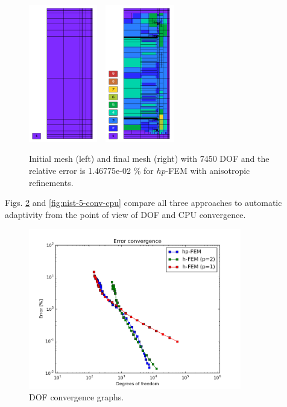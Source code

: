 \documentclass[12pt]{elsarticle}
\begin{document}
\begin{figure}[H]
\centering
\includegraphics[height=6cm]{nist/nist-5/mesh_hp_aniso_init.png}\ \
\includegraphics[height=6cm]{nist/nist-5/mesh_hp_aniso.png}
\caption{Initial mesh (left) and final mesh (right) with 7450 DOF and the relative error is 1.46775e-02 \% for $hp$-FEM with anisotropic refinements.}
\label{fig:nist-5-hp-aniso}
\end{figure}

Figs. \ref{fig:nist-5-conv-dof} and \ref{fig:nist-5-conv-cpu} compare all
three approaches to automatic adaptivity from the point
of view of DOF and CPU convergence.

\begin{figure}[H]
\centering
\includegraphics[height=7cm]{nist/nist-5/conv_dof_aniso.png}
\caption{DOF convergence graphs.}
\label{fig:nist-5-conv-dof}
\end{figure}
\end{document}
